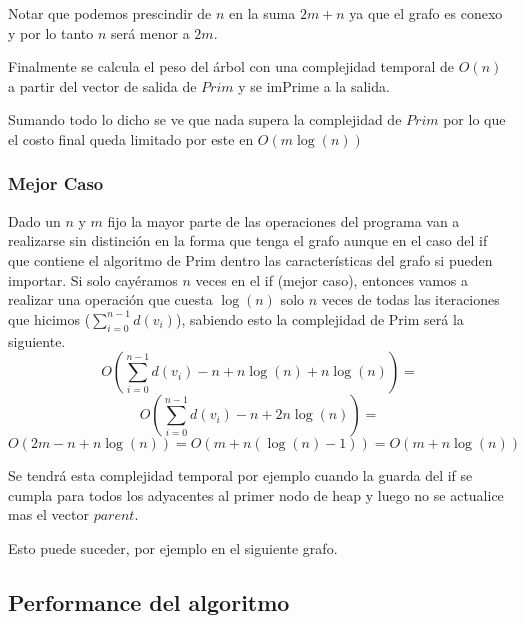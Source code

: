 Notar que podemos prescindir de $n$ en la suma $2m+n$ ya que el grafo es conexo y por lo tanto $n$ será menor a $2m$.

Finalmente se calcula el peso del árbol con una complejidad temporal de $O(n)$ a partir del vector de salida de $Prim$ y se imPrime a la salida.

Sumando todo lo dicho se ve que nada supera la complejidad de $Prim$ por lo que el costo final queda limitado por este en $O(m \log(n))$

\subsubsection{Mejor Caso}

Dado un $n$ y $m$ fijo la mayor parte de las operaciones del programa van a realizarse sin distinción en la forma que tenga el grafo aunque en el caso del if que contiene el algoritmo de Prim dentro las características del grafo si pueden importar. Si solo cay\'eramos $n$ veces en el if (mejor caso), entonces vamos a realizar una operación que cuesta $\log(n)$ solo $n$ veces de todas las iteraciones que hicimos ($\sum_{i=0}^{n-1}d(v_{i})$), sabiendo esto la complejidad de Prim será la siguiente.
	$$O( \sum_{i=0}^{n-1}d(v_{i}) - n + n \log(n) + n \log(n) ) = $$
	$$O( \sum_{i=0}^{n-1}d(v_{i}) - n + 2n \log(n) ) = $$
	$$O( 2m - n + n \log(n) ) = O( m + n (\log(n)-1) ) = O( m + n \log(n)) $$

Se tendrá esta complejidad temporal por ejemplo cuando la guarda del if se cumpla para todos los adyacentes al primer nodo de heap y luego no se actualice mas el vector $parent$.

Esto puede suceder, por ejemplo en el siguiente grafo.
	
\begin{figure}[H]
\centering
%
\end{figure}

\subsection{Performance del algoritmo}

